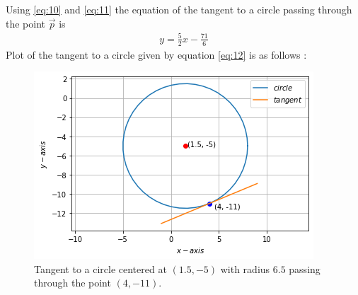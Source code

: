 \documentclass[journal,12pt,twocolumn]{IEEEtran}
\begin{document}
Using \eqref{eq:10} and \eqref{eq:11} the equation of the tangent to a circle passing through the point $\vec{p}$ is
\begin{align}
    y=\frac{5}{2}x-\frac{71}{6}\label{eq:12}
\end{align}
Plot of the tangent to a circle given by equation \eqref{eq:12} is as follows :
\begin{figure}[h]
\centering
    \includegraphics[width=\columnwidth]{tangent.png}
    \caption{Tangent to a circle centered at $(1.5, -5)$ with radius $6.5$ passing through the point $(4,-11)$.}
    \label{tangent}
\end{figure}
\end{document}
